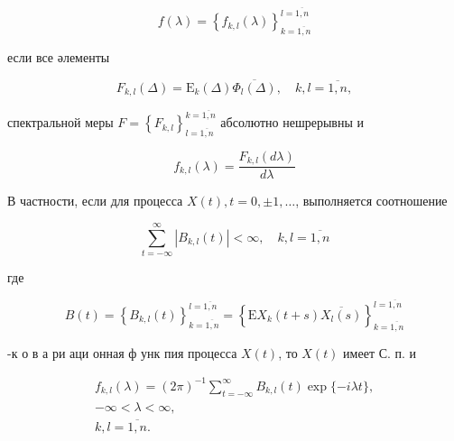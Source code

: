 \documentclass[10pt]{article}
\begin{document}
\[

f(\lambda)=\left\{f_{k, l}(\lambda)\right\}_{k=\overline{1, n}}^{l=\overline{1, n}}

\]



если все әлементы



\[

F_{k, l}(\Delta)=\mathrm{E}_{k}(\Delta) \overline{\Phi_{l}(\Delta)}, \quad k, l=\overline{1, n},

\]



спектральной меры $F=\left\{F_{k, l}\right\}_{l=\overline{1, n}}^{k=\overline{1, n}}$ абсолютно нешрерывны и



\[

f_{k, l}(\lambda)=\frac{F_{k, l}(d \lambda)}{d \lambda}

\]



В частности, если для процесса $X(t), t=0, \pm 1, \ldots$, выполняется соотношение



\[

\sum_{t=-\infty}^{\infty}\left|B_{k, l}(t)\right|<\infty, \quad k, l=\overline{1, n}

\]



где



\[

B(t)=\left\{B_{k, l}(t)\right\}_{k=\overline{1, n}}^{l=\overline{1, n}}=\left\{\mathrm{E} X_{k}(t+s) \overline{X_{l}(s)}\right\}_{k=\overline{1, n}}^{l=\overline{1, n}}

\]



-к о в а ри аци онная ф унк пия процесса $X(t)$, то $X(t)$ имеет С. п. и



\[

\begin{gathered}

f_{k, l}(\lambda)=(2 \pi)^{-1} \sum_{t=-\infty}^{\infty} B_{k, l}(t) \exp \{-i \lambda t\}, \\

-\infty<\lambda<\infty, \\

k, l=\overline{1, n} .

\end{gathered}

\]
\end{document}
